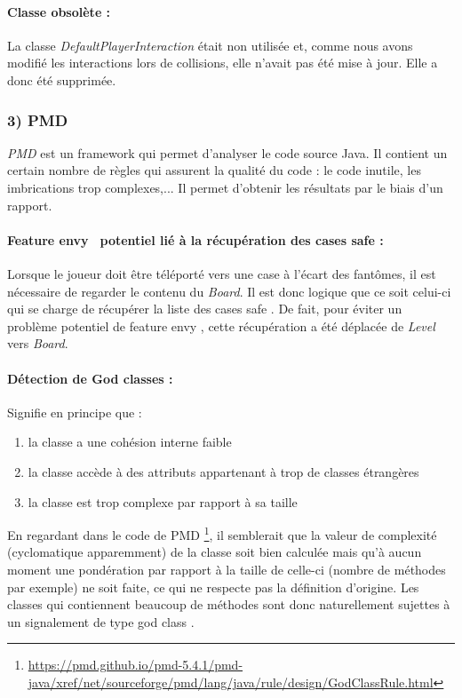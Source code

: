 \documentclass[12pt, openany]{report}
\begin{document}
\paragraph{Classe obsolète : }
La classe \mbox{\textit{DefaultPlayerInteraction}} était non utilisée et, comme nous avons modifié les interactions lors de collisions, elle n'avait pas été mise à jour.
Elle a donc été supprimée.

\subsubsection*{3) PMD}

\textit{PMD} est un framework qui permet d'analyser le code source Java. Il contient un certain nombre de règles qui assurent la qualité du code : le code inutile, les imbrications trop complexes,... Il permet d'obtenir les résultats par le biais d'un rapport.

\paragraph{\og Feature envy \fg \, potentiel lié à la récupération des cases \og safe \fg : }
Lorsque le joueur doit être téléporté vers une case à l'écart des fantômes, il est nécessaire de regarder le contenu du \textit{Board}. Il est donc logique que ce soit celui-ci qui se charge de récupérer la liste des cases \og safe \fg . De fait, pour éviter un problème potentiel de \og feature envy \fg , cette récupération a été déplacée de \textit{Level} vers \textit{Board}.
\paragraph{Détection de \og God classes \fg : }
Signifie en principe que :
\begin{enumerate}
	\item la classe a une \og cohésion interne \fg \space faible
	\item la classe accède à des attributs appartenant à trop de classes étrangères
	\item la classe est trop complexe par rapport à sa taille
\end{enumerate}
En regardant dans le code de PMD \footnote{\url{https://pmd.github.io/pmd-5.4.1/pmd-java/xref/net/sourceforge/pmd/lang/java/rule/design/GodClassRule.html}}, il semblerait que la valeur de complexité (cyclomatique apparemment) de la classe soit bien calculée mais qu'à aucun moment une pondération par rapport à la taille de celle-ci (nombre de méthodes par exemple) ne soit faite, ce qui ne respecte pas la définition d'origine.
Les classes qui contiennent beaucoup de méthodes sont donc naturellement sujettes à un signalement de type \og god class \fg.
\end{document}
